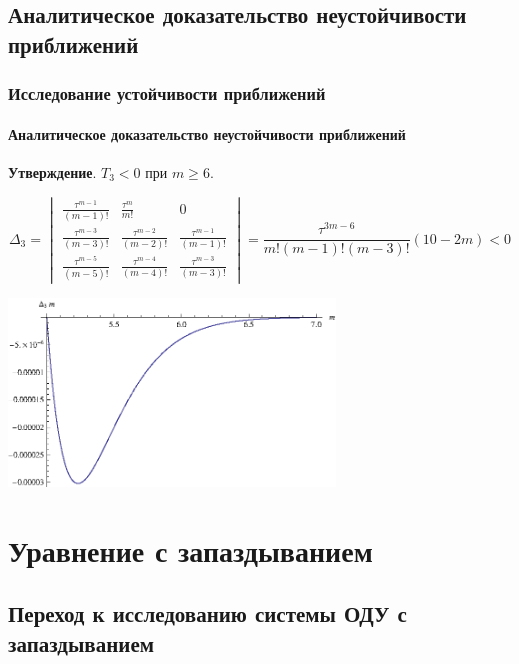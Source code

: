 \documentclass{beamer}
\numberwithin{equation}{section}
\begin{document}
    \subsection{Аналитическое доказательство неустойчивости приближений}
    \begin{frame}
        \frametitle{Исследование устойчивости приближений}
        \framesubtitle{Аналитическое доказательство неустойчивости приближений}

        \textbf{Утверждение}. $T_3 < 0$ при $m \geq 6$.

        \begin{equation}
            \Delta_3 = 
            \begin{vmatrix}
                \frac{\tau^{m-1}}{(m-1)!} & \frac{\tau^{m}}{m!} & 0\\
                \frac{\tau^{m-3}}{(m-3)!} & \frac{\tau^{m-2}}{(m-2)!} & \frac{\tau^{m-1}}{(m-1)!}\\
                \frac{\tau^{m-5}}{(m-5)!} & \frac{\tau^{m-4}}{(m-4)!} & \frac{\tau^{m-3}}{(m-3)!}
            \end{vmatrix} =
            \dfrac{\tau^{3m-6}}{m!(m-1)!(m-3)!} (10-2m) < 0
        \end{equation}

        \begin{center}
            \includegraphics[width=0.65\textwidth]{coefCheck.eps}
        \end{center}
    
    \end{frame}

    \section{Уравнение с запаздыванием}

    \subsection{Переход к исследованию системы ОДУ с запаздыванием}
\end{document}
